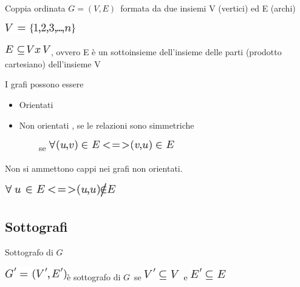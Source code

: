\documentclass{article}
\providecommand{\tightlist}{%
  \setlength{\itemsep}{0pt}\setlength{\parskip}{0pt}}
\begin{document}
{{Coppia ordinata }$G=(V,E)${~formata da due
insiemi V (vertici) ed E (archi)}

\includegraphics{images/image336.png}

\includegraphics{images/image337.png}{, ovvero E è un sottoinsieme
dell'insieme delle parti (prodotto cartesiano) dell'insieme V}

{}

{I grafi possono essere}

\begin{itemize}
\tightlist
\item
  {Orientati}
\item
  {Non orientati , se le relazioni sono simmetriche}
\end{itemize}

{~~~~~~~~se }\includegraphics{images/image338.png}



{Non si ammettono cappi nei grafi non orientati.}

\includegraphics{images/image339.png}

{}

\hypertarget{h.5gj1hs8i1ooy}{\subsection{\texorpdfstring{{Sottografi}}{Sottografi}}\label{h.5gj1hs8i1ooy}}

{Sottografo di }$G$

\includegraphics{images/image341.png}{è sottografo di
}$G${~se
}\includegraphics{images/image342.png}{~e
}\includegraphics{images/image343.png}

{}

}
\end{document}
